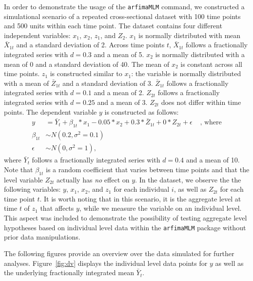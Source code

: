 \documentclass[12pt]{paper}\usepackage[]{graphicx}\usepackage[]{color}
\begin{document}
In order to demonstrate the usage of the \texttt{arfimaMLM} command, we constructed a simulational scenario of a repeated cross-sectional dataset with 100 time points and 500 units within each time point. The dataset contains four different independent variables: $x_1$, $x_2$, $z_1$, and $Z_2$. $x_1$ is normally distributed with mean $\bar{X}_{1t}$ and a standard deviation of 2. Across time points $t$, $\bar{X}_{1t}$ follows a fractionally integrated series with $d=0.3$ and a mean of 5. $x_2$ is normally distributed with a mean of 0 and a standard deviation of 40. The mean of $x_2$ is constant across all time points. $z_1$ is constructed similar to $x_1$: the variable is normally distributed with a mean of $\bar{Z}_{1t}$ and a standard deviation of 3. $\bar{Z}_{1t}$ follows a fractionally integrated series with $d=0.1$ and a mean of 2. $Z_{2t}$ follows a fractionally integrated series with $d=0.25$ and a mean of 3. $Z_{2t}$ does not differ within time points. The dependent variable $y$ is constructed as follows:
\begin{align}
y &=\bar{Y}_t+\beta_{1t} * x_1 - 0.05 * x_2 + 0.3 * \bar{Z}_{1t} + 0 * Z_{2t} + \epsilon &\text{ , where} \nonumber \\
\beta_{1t} &\sim N(0.2,\sigma^2=0.1) & \nonumber \\
\epsilon &\sim N(0,\sigma^2=1), &
\end{align}
where $\bar{Y}_t$ follows a fractionally integrated series with $d=0.4$ and a mean of 10. Note that $\beta_{1t}$ is a random coefficient that varies between time points and that the level variable $Z_{2t}$ actually has \textit{no} effect on $y$. In the dataset, we observe the the following variables: $y$, $x_1$, $x_2$, and $z_1$ for each individual $i$, as well as $Z_{2t}$ for each time point $t$. It is worth noting that in this scenario, it is the aggregate level at time $t$ of $z_1$ that affects $y$, while we measure the variable on an individual level. This aspect was included to demonstrate the possibility of testing aggregate level hypotheses based on individual level data within the \texttt{arfimaMLM} package without prior data manipulations.

The following figures provide an overview over the data simulated for further analyses. Figure~\ref{fig:dv} displays the individual level data points for $y$ as well as the underlying fractionally integrated mean $\bar{Y}_t$.
\end{document}
